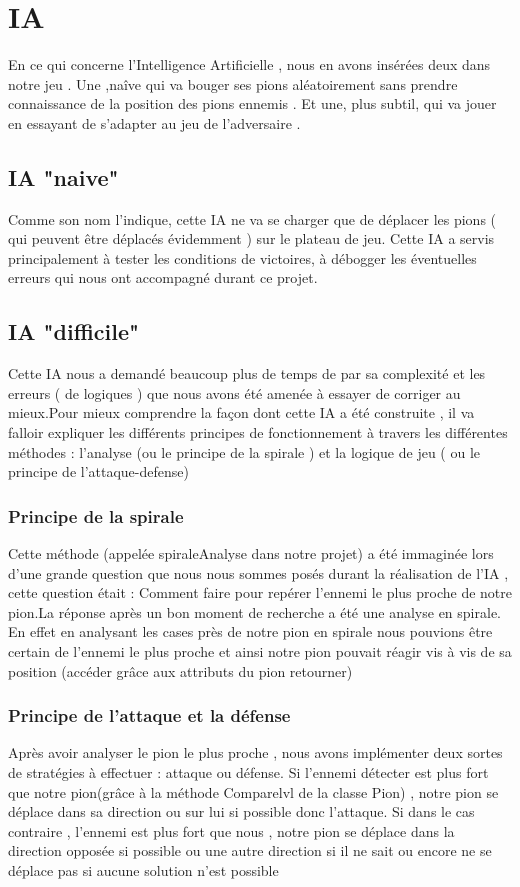 \documentclass[10pt]{article}
\begin{document}
\section{IA}
 En ce qui concerne l'Intelligence Artificielle , nous en avons insérées deux dans notre jeu . Une ,naîve qui va bouger ses pions aléatoirement sans prendre connaissance de la position des pions ennemis . Et une, plus subtil, qui va jouer en essayant de s'adapter au jeu de l'adversaire .
\subsection{IA "naive"}

Comme son nom l'indique, cette IA ne va se charger que de déplacer les pions ( qui peuvent être déplacés évidemment ) sur le plateau de jeu.
Cette IA a servis principalement à tester les conditions de victoires, à débogger les éventuelles erreurs qui nous ont accompagné durant ce projet.

\subsection {IA "difficile"}
Cette IA nous a demandé beaucoup plus de temps de par sa complexité et les erreurs ( de logiques ) que nous avons été amenée à essayer de corriger au mieux.Pour mieux comprendre la façon dont cette IA a été construite , il va falloir expliquer les différents principes de fonctionnement à travers les différentes méthodes : l'analyse (ou le principe de la spirale ) et la logique de jeu ( ou le principe de l'attaque-defense)  

\subsubsection {Principe de la spirale}
Cette méthode (appelée spiraleAnalyse dans notre projet) a été immaginée lors d'une grande question que nous nous sommes posés durant la réalisation de l'IA , cette question était : Comment faire pour repérer l'ennemi le plus proche de notre pion.La réponse après un bon moment de recherche a été une analyse en spirale. En effet en analysant les cases près de notre pion en spirale nous pouvions être certain de l'ennemi le plus proche et ainsi notre pion pouvait réagir vis à vis de sa position (accéder grâce aux attributs du pion retourner)  
\subsubsection {Principe de l'attaque et la défense}
Après avoir analyser le pion le plus proche , nous avons implémenter deux sortes de stratégies à effectuer : attaque ou défense. Si l'ennemi détecter est plus fort que notre pion(grâce à la méthode Comparelvl de la classe Pion) , notre pion se déplace dans sa direction ou sur lui si possible donc l'attaque. Si dans le cas contraire , l'ennemi est plus fort que nous , notre pion se déplace dans la direction opposée si possible ou une autre direction si il ne sait ou encore ne se déplace pas si aucune solution n'est possible 
\end{document}

